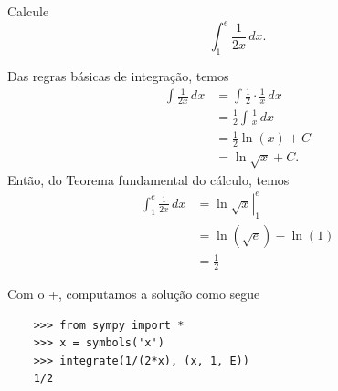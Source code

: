  

\begin{exeresol}
  Calcule
  \begin{equation}
    \int_1^{e} \frac{1}{2x}\,dx.
  \end{equation}
\end{exeresol}
\begin{resol}
  Das regras básicas de integração, temos
  \begin{align}
    \int \frac{1}{2x}\,dx &= \int \frac{1}{2}\cdot\frac{1}{x}\,dx \\
                          &= \frac{1}{2}\int\frac{1}{x}\,dx \\
                          &= \frac{1}{2}\ln(x) + C \\
                          &= \ln\sqrt{x} + C.
  \end{align}
  Então, do Teorema fundamental do cálculo, temos
  \begin{align}
    \int_1^e \frac{1}{2x}\,dx &= \left.\ln\sqrt{x}\right|_1^e\\
                              &= \ln(\sqrt{e}) - \ln(1)\\
                              &= \frac{1}{2}
  \end{align}

  \ifispython
  Com o {\python}+{\sympy}, computamos a solução como segue
  \begin{lstlisting}
    >>> from sympy import *
    >>> x = symbols('x')
    >>> integrate(1/(2*x), (x, 1, E))
    1/2
  \end{lstlisting}
  \fi    
\end{resol}


